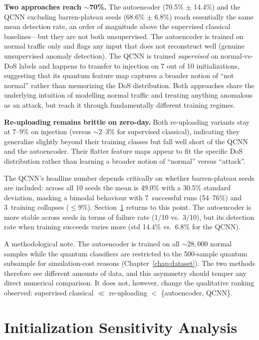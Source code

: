 \textbf{Two approaches reach $\sim$70\%.} The autoencoder (70.5\% $\pm$ 14.4\%) and the QCNN excluding barren-plateau seeds (68.6\% $\pm$ 6.8\%) reach essentially the same mean detection rate, an order of magnitude above the supervised classical baselines---but they are not both unsupervised. The autoencoder is trained on normal traffic only and flags any input that does not reconstruct well (genuine unsupervised anomaly detection). The QCNN is trained \emph{supervised} on normal-vs-DoS labels and happens to transfer to injection on 7 out of 10 initializations, suggesting that its quantum feature map captures a broader notion of ``not normal'' rather than memorizing the DoS distribution. Both approaches share the underlying intuition of modelling normal traffic and treating anything anomalous as an attack, but reach it through fundamentally different training regimes.

\textbf{Re-uploading remains brittle on zero-day.} Both re-uploading variants stay at 7--9\% on injection (versus ${\sim}2$--$3$\% for supervised classical), indicating they generalize slightly beyond their training classes but fall well short of the QCNN and the autoencoder. Their flatter feature maps appear to fit the specific DoS distribution rather than learning a broader notion of ``normal'' versus ``attack''.

The QCNN's headline number depends critically on whether barren-plateau seeds are included: across all 10 seeds the mean is 49.0\% with a 30.5\% standard deviation, masking a bimodal behaviour with 7~successful runs (54--76\%) and 3~training collapses ($\leq 9\%$). Section~\ref{sec:res_sensitivity} returns to this point. The autoencoder is more stable across seeds in terms of failure rate (1/10 vs.\ 3/10), but its detection rate when training succeeds varies more (std 14.4\% vs.\ 6.8\% for the QCNN).

A methodological note. The autoencoder is trained on all ${\sim}28{,}000$ normal samples while the quantum classifiers are restricted to the 500-sample quantum subsample for simulation-cost reasons (Chapter~\ref{chap:dataset}). The two methods therefore see different amounts of data, and this asymmetry should temper any direct numerical comparison. It does not, however, change the qualitative ranking observed: supervised classical $\ll$ re-uploading $<$ \{autoencoder, QCNN\}.

\section{Initialization Sensitivity Analysis}
\label{sec:res_sensitivity}

